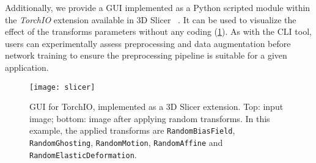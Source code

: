 Additionally, we provide a \ac{GUI} implemented as a Python scripted module within the \textit{TorchIO} extension available in 3D Slicer~\cite{fedorov_3d_2012}%
.
It can be used to visualize the effect of the transforms parameters without any coding (\cref{fig:slicer}).
As with the \ac{CLI} tool, users can experimentally assess preprocessing and data augmentation before network training to ensure the preprocessing pipeline is suitable for a given application.

\begin{figure}
  \centering
  \texttt{[image: slicer]}
  \caption[Graphical user interface for TorchIO]{
    \Ac{GUI} for TorchIO, implemented as a 3D Slicer extension.
    Top: input image;
    bottom: image after applying random transforms.
    In this example, the applied transforms are
    \texttt{RandomBiasField},
    \texttt{RandomGhosting},
    \texttt{RandomMotion},
    \texttt{RandomAffine} and
    \texttt{RandomElasticDeformation}.
  }
  \label{fig:slicer}
\end{figure}
